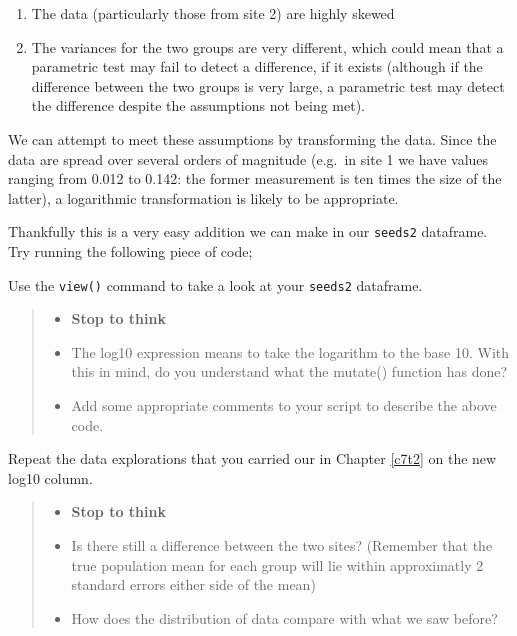 \documentclass[
]{book}
\newenvironment{Shaded}{\begin{snugshade}}{\end{snugshade}}
\newcommand{\AttributeTok}[1]{\textcolor[rgb]{0.13,0.29,0.53}{#1}}
\newcommand{\FunctionTok}[1]{\textcolor[rgb]{0.13,0.29,0.53}{\textbf{#1}}}
\newcommand{\NormalTok}[1]{#1}
\newcommand{\OtherTok}[1]{\textcolor[rgb]{0.56,0.35,0.01}{#1}}
\newcommand{\SpecialCharTok}[1]{\textcolor[rgb]{0.81,0.36,0.00}{\textbf{#1}}}
\providecommand{\tightlist}{%
  \setlength{\itemsep}{0pt}\setlength{\parskip}{0pt}}
\begin{document}
\begin{enumerate}
\def\labelenumi{\arabic{enumi})}
\tightlist
\item
  The data (particularly those from site 2) are highly skewed
\item
  The variances for the two groups are very different, which could mean that a parametric test may fail to detect a difference, if it exists (although if the difference between the two groups is very large, a parametric test may detect the difference despite the assumptions not being met).
\end{enumerate}

We can attempt to meet these assumptions by transforming the data. Since the data are spread over several orders of magnitude (e.g.~in site 1 we have values ranging from 0.012 to 0.142: the former measurement is ten times the size of the latter), a logarithmic transformation is likely to be appropriate.

Thankfully this is a very easy addition we can make in our \texttt{seeds2} dataframe. Try running the following piece of code;

\begin{Shaded}
\end{Shaded}

Use the \texttt{view()} command to take a look at your \texttt{seeds2} dataframe.

\begin{quote}
\begin{itemize}
\tightlist
\item
  \textbf{Stop to think}
\item
  The log10 expression means to take the logarithm to the base 10. With this in mind, do you understand what the mutate() function has done?
\item
  Add some appropriate comments to your script to describe the above code.
\end{itemize}
\end{quote}

Repeat the data explorations that you carried our in Chapter \ref{c7t2} on the new log10 column.

\begin{quote}
\begin{itemize}
\tightlist
\item
  \textbf{Stop to think}
\item
  Is there still a difference between the two sites? (Remember that the true population mean for each group will lie within approximatly 2 standard errors either side of the mean)
\item
  How does the distribution of data compare with what we saw before?
\end{itemize}
\end{quote}
\end{document}

